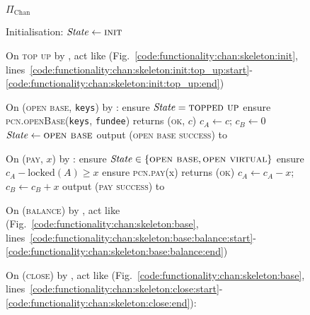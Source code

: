 \begin{figure}[H]
  \begin{protocolbox}{$\Pi_{\mathrm{Chan}}$}
    \begin{algorithmic}[1]
      \State Initialisation:
      \Indent
        \State $\mathit{State} \gets \textsc{init}$
      \EndIndent
      \Statex

      \State On \textsc{top up} by \environment, act like \fchan
      (Fig.~\ref{code:functionality:chan:skeleton:init},
      lines~\ref{code:functionality:chan:skeleton:init:top_up:start}-\ref{code:functionality:chan:skeleton:init:top_up:end})
      \Statex

      \State On (\textsc{open base}, \texttt{keys}) by \environment:
      \Indent
        \State ensure $\mathit{State} = \textsc{topped up}$
        \State ensure \textsc{pcn.openBase}(\texttt{keys}, \texttt{fundee})
        returns (\textsc{ok}, $c$)
        \State $c_A \gets c$; $c_B \gets 0$
        \State $\mathit{State} \gets \textsc{open base}$
        \State output (\textsc{open base success}) to \environment
      \EndIndent
      \Statex

      \State On (\textsc{pay}, $x$) by \environment:
      \Indent
        \State ensure $\mathit{State} \in \{\textsc{open base}, \textsc{open
        virtual}\}$
        \State ensure $c_A - \mathrm{locked}(A) \geq x$
        \State ensure \textsc{pcn.pay}(x) returns (\textsc{ok})
        \State $c_A \gets c_A - x$; $c_B \gets c_B + x$
        \State output (\textsc{pay success}) to \environment
      \EndIndent
      \Statex

      \State On (\textsc{balance}) by \environment, act like \fchan
      (Fig.~\ref{code:functionality:chan:skeleton:base},
      lines~\ref{code:functionality:chan:skeleton:base:balance:start}-\ref{code:functionality:chan:skeleton:base:balance:end})
      \Statex

      \State On (\textsc{close}) by \environment, act like \fchan
      (Fig.~\ref{code:functionality:chan:skeleton:base},
      lines~\ref{code:functionality:chan:skeleton:close:start}-\ref{code:functionality:chan:skeleton:close:end}):
    \end{algorithmic}
  \end{protocolbox}
  \caption{}
  \label{code:protocol:chan:skeleton}
\end{figure}

